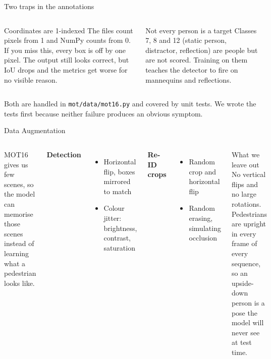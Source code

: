 \documentclass[aspectratio=169,11pt]{beamer}
\begin{document}
\begin{frame}{Two traps in the annotations}
  \begin{columns}[T,onlytextwidth]
      \begin{alertblock}{Coordinates are 1-indexed}
        The files count pixels from 1 and NumPy counts from 0. If you miss
        this, every box is off by one pixel. The output still looks correct,
        but IoU drops and the metrics get worse for no visible reason.
      \end{alertblock}
      \begin{alertblock}{Not every person is a target}
        Classes 7, 8 and 12 (static person, distractor, reflection) are people
        but are not scored. Training on them teaches the detector to fire on
        mannequins and reflections.
      \end{alertblock}
  \end{columns}
  \vspace{1.1em}
  Both are handled in \texttt{mot/data/mot16.py} and covered by unit tests. We
  wrote the tests first because neither failure produces an obvious symptom.
\end{frame}

\begin{frame}{Data Augmentation}
  \begin{columns}[T,onlytextwidth]
      {\small MOT16 gives us few scenes, so the model can memorise those scenes
      instead of learning what a pedestrian looks like.}
      \vspace{0.6em}

      \textbf{Detection}
      \begin{itemize}\small
        \item Horizontal flip, boxes mirrored to match
        \item Colour jitter: brightness, contrast, saturation
      \end{itemize}
      \vspace{0.4em}
      \textbf{Re-ID crops}
      \begin{itemize}\small
        \item Random crop and horizontal flip
        \item Random erasing, simulating occlusion
      \end{itemize}
      \begin{block}{What we leave out}
        No vertical flips and no large rotations. Pedestrians are upright in
        every frame of every sequence, so an upside-down person is a pose the
        model will never see at test time.
      \end{block}
  \end{columns}
\end{frame}
\end{document}

